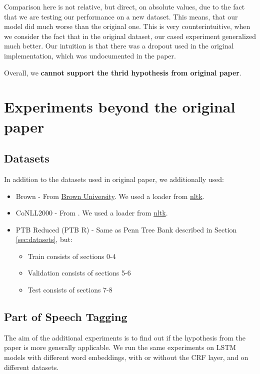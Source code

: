 \documentclass[11pt,a4paper]{article}
\begin{document}
    Comparison here is not relative, but direct, on absolute values, due to the fact that we are testing our performance on a new dataset. This means, that our model did much worse than the original one. This is very counterintuitive, when we consider the fact that in the original dataset, our cased experiment generalized much better. Our intuition is that there was a dropout used in the original implementation, which was undocumented in the paper.

    Overall, we \textbf{cannot support the thrid hypothesis from original paper}.

\section{Experiments beyond the original paper}

    \subsection{Datasets}
    In addition to the datasets used in original paper, we additionally used:
    \begin{itemize}
        \item Brown - From \href{http://korpus.uib.no/icame/brown/bcm.html}{Brown University}. We used a loader from \href{https://www.nltk.org/}{nltk}.
        \item CoNLL2000 - From \cite{conll2000}. We used a loader from \href{https://www.nltk.org/}{nltk}.
        \item PTB Reduced (PTB R) - Same as Penn Tree Bank described in Section \ref{sec:datasets}, but:
        \begin{itemize}
            \item Train consists of sections 0-4
            \item Validation consists of sections 5-6
            \item Test consists of sections 7-8
        \end{itemize}
    \end{itemize}

    \subsection{Part of Speech Tagging}
    The aim of the additional experiments is to find out if the hypothesis from the paper is more generally applicable. We run the same experiments on LSTM models with different word embeddings, with or without the CRF layer, and on different datasets.
\end{document}
